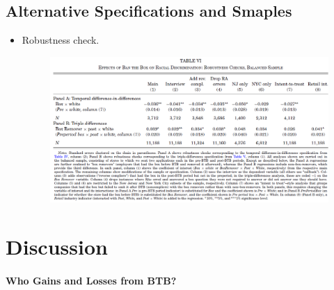 \documentclass[../root]{subfiles}
\begin{document}
    \subsection{Alternative Specifications and Smaples}

    \begin{itemize}
      \item Robustness check.
      \begin{figure}[ht]
          \centering
          \includegraphics[scale = .8]{0925tanji/T6}
      \end{figure}
    \end{itemize}

    \section{Discussion}

    \paragraph{Who Gains and Losses from BTB?}
\end{document}
